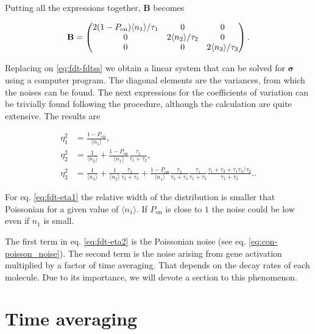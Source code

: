 Putting all the expressions together, $\mathbf{B}$ becomes

\begin{equation}
  \label{eq:fdt-B}
  \mathbf{B} = 
  \begin{pmatrix}
    2(1-P_\text{on})\langle n_1\rangle/\tau_1 & 0 & 0 \\
    0 & 2\langle n_2\rangle/\tau_2 & 0 \\
    0 & 0 & 2\langle n_3\rangle/\tau_3
  \end{pmatrix}.\\
\end{equation}

Replacing on \eqref{eq:fdt-fdtss} we obtain a linear system that can be solved for $\mathbf{\sigma}$ using a computer program. The diagonal elements are the variances, from which the noises can be found. The next expressions for the coefficients of variation can be trivially found following the procedure, although the calculation are quite extensive. The results are

\begin{align}
  \eta_1^2 &= \frac{1-P_\text{on}}{\langle n_1\rangle}, \label{eq:fdt-eta1}\\
  \eta_2^2 &= \frac{1}{\langle n_2\rangle}+\frac{1-P_\text{on}}{\langle n_1\rangle}\frac{\tau_1}{\tau_1+\tau_2}, \label{eq:fdt-eta2}\\
  \eta_3^2 &= \frac{1}{\langle n_3\rangle} + \frac{1}{\langle n_2\rangle}\frac{\tau_2}{\tau_2+\tau_3}+\frac{1-P_\text{on}}{\langle n_1\rangle}\frac{\tau_2}{\tau_2+\tau_3}\frac{\tau_1}{\tau_1+\tau_3}\frac{\tau_1+\tau_3+\tau_1\tau_3/\tau_2}{\tau_1+\tau_2}. \label{eq:fdt-eta3}.
\end{align}

For eq. \eqref{eq:fdt-eta1} the relative width of the distribution is smaller that Poissonian for a given value of $\langle n_1\rangle$. If $P_\text{on}$ is close to $1$ the noise could be low even if $n_1$ is small.

The first term in eq. \eqref{eq:fdt-eta2} is the Poissonian noise (see eq. \eqref{eq:con-poisson_noise}). The second term is the noise arising from gene activation multiplied by a factor of time averaging. That depends on the decay rates of each molecule. Due to its importance, we will devote a section to this phenomenon.

\section{Time averaging}
\label{sec:fdt-time-ave}

